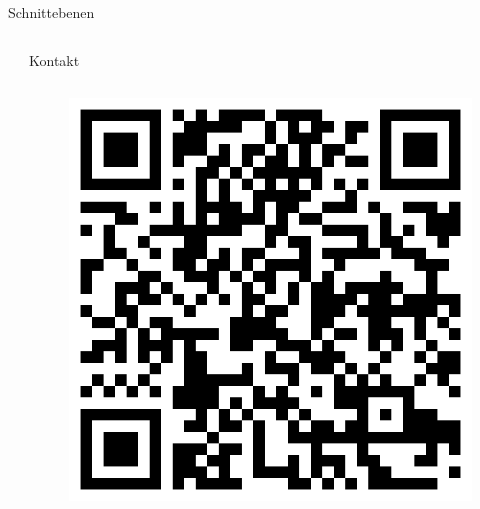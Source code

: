 \documentclass[final,hyperref={pdfpagelabels=false}]{beamer}
\begin{document}
\begin{frame}[t]
\begin{columns}[t]
\begin{column}{.465\textwidth}
\begin{block}{Schnittebenen}
     
   
   
\end{block}


\end{column} %



\begin{column}{.025\textwidth}\end{column} %

\end{columns} %


\begin{columns}[t] %

\begin{column}{.025\textwidth}\end{column} %

\begin{column}{.465\textwidth} %


\begin{block}{Kontakt}
\begin{columns}[t]
\begin{column}{.35\textwidth}
\begin{figure}[h]
\vspace*{-1.0cm}
\centering
\includegraphics[width=.9\textwidth]{qrcode}
\end{figure}
\end{column}




\end{columns}
\end{block}
\end{column}
\end{columns}
\end{frame}
\end{document}
